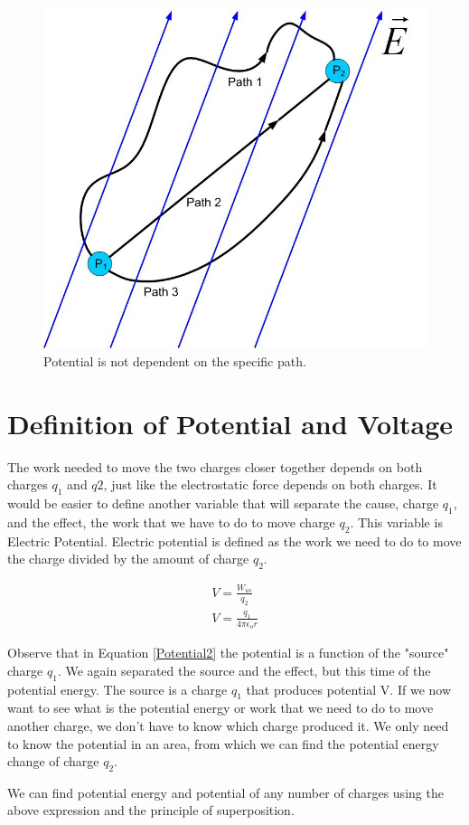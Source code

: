 \documentclass{ximera}
\begin{document}
\begin{figure}[htbp]
\begin{center}
\includegraphics[scale=0.5]{../jpg/workindependentofpath.jpg}
\end{center} 
\caption{Potential is not dependent on the specific path.}\label{PotentialWork}
\end{figure}


\section{Definition of Potential and Voltage}


The work needed to move the two charges closer together depends on both charges $q_1$ and $q2$, just like the electrostatic force depends on both charges. It would be easier to define another variable that will separate the cause, charge $q_1$, and the effect, the work that we have to do to move charge $q_2$. This variable is Electric Potential. Electric potential is defined as the work we need to do to move the charge divided by the amount of charge $q_2$.

\begin{eqnarray}
V=\frac{W_{us}}{q_2} \\
V=\frac{q_1}{4 \pi \epsilon_o r} \label{Potential2}
\end{eqnarray}

Observe that in Equation \ref{Potential2} the potential is a function of the "source" charge $q_1$. We again separated the source and the effect, but this time of the potential energy. The source is a charge $q_1$ that produces potential V. If we now want to see what is the potential energy or work that we need to do to move another charge, we don't have to know which charge produced it. We only need to know the potential in an area, from which we can find the potential energy change of charge $q_2$. 

We can find potential energy and potential of any number of charges using the above expression and the principle of superposition. 
\end{document}

